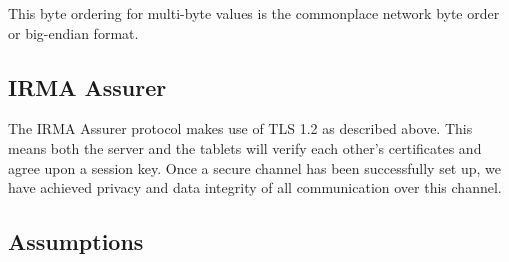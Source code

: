 This byte ordering for multi-byte values is the commonplace network byte order or big-endian format.~\cite{tls1.2}





\subsection{IRMA Assurer}
The IRMA Assurer protocol makes use of TLS 1.2 as described above. This means both the server and the tablets will verify each other's certificates and agree upon a session key. Once a secure channel has been successfully set up, we have achieved privacy and data integrity of all communication over this channel.~\cite{tls1.2} 

\subsection{Assumptions}
\label{sec:assumptions}
